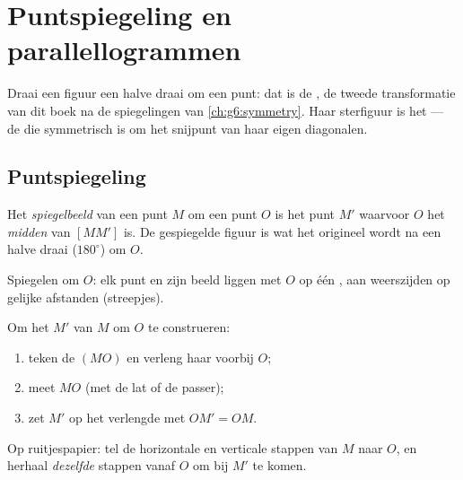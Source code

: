 \chapter{Puntspiegeling en parallellogrammen}\label{ch:g7:central}

Draai een figuur een halve draai om een punt: dat is de
\emph{}, de tweede transformatie van dit boek na de spiegelingen van
\cref{ch:g6:symmetry}. Haar sterfiguur is het  --- de  die
symmetrisch is om het snijpunt van haar eigen diagonalen.

\section{Puntspiegeling}

\begin{definition}\label{def:g7:central:def}
Het \emph{spiegelbeeld} van een punt $M$ om een punt $O$ is
het punt $M'$ waarvoor $O$ het \emph{midden} van $[MM']$ is. De gespiegelde figuur
is wat het origineel wordt na een halve draai ($180^\circ$) om $O$.
\end{definition}

\begin{omfigure}

{\small Spiegelen om $O$: elk punt en zijn beeld liggen met $O$ op één , aan
weerszijden op gelijke afstanden (streepjes).}
\end{omfigure}

\begin{method}\label{met:g7:central:construct}
Om het  $M'$ van $M$ om $O$ te construeren:
\begin{enumerate}
  \item teken de  $(MO)$ en verleng haar voorbij $O$;
  \item meet $MO$ (met de lat of de passer);
  \item zet $M'$ op het verlengde met $OM' = OM$.
\end{enumerate}
Op ruitjespapier: tel de horizontale en verticale stappen van $M$ naar $O$, en
herhaal \emph{dezelfde} stappen vanaf $O$ om bij $M'$ te komen.
\end{method}

